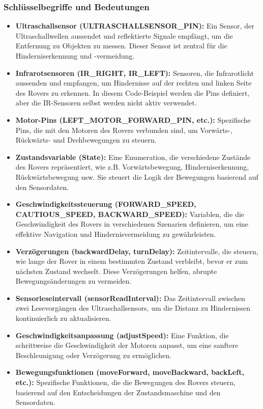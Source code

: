 \documentclass{vorlage-design-main}
\begin{document}
\newpage

\hypertarget{schluxfcsselbegriffe-und-bedeutungen}{%
\subsubsection{Schlüsselbegriffe und
Bedeutungen}\label{schluesselbegriffe-und-bedeutungen}}

\begin{itemize}
\item
  \textbf{Ultraschallsensor (ULTRASCHALLSENSOR\_PIN):} Ein Sensor, der
  Ultraschallwellen aussendet und reflektierte Signale empfängt, um die
  Entfernung zu Objekten zu messen. Dieser Sensor ist zentral für die
  Hinderniserkennung und -vermeidung.
\item
  \textbf{Infrarotsensoren (IR\_RIGHT, IR\_LEFT):} Sensoren, die
  Infrarotlicht aussenden und empfangen, um Hindernisse auf der rechten
  und linken Seite des Rovers zu erkennen. In diesem Code-Beispiel
  werden die Pins definiert, aber die IR-Sensoren selbst werden nicht
  aktiv verwendet.
\item
  \textbf{Motor-Pins (LEFT\_MOTOR\_FORWARD\_PIN, etc.):} Spezifische
  Pins, die mit den Motoren des Rovers verbunden sind, um Vorwärts-,
  Rückwärts- und Drehbewegungen zu steuern.
\item
  \textbf{Zustandsvariable (State):} Eine Enumeration, die verschiedene
  Zustände des Rovers repräsentiert, wie z.B. Vorwärtsbewegung,
  Hinderniserkennung, Rückwärtsbewegung usw. Sie steuert die Logik der
  Bewegungen basierend auf den Sensordaten.
\item
  \textbf{Geschwindigkeitssteuerung (FORWARD\_SPEED, CAUTIOUS\_SPEED,
  BACKWARD\_SPEED):} Variablen, die die Geschwindigkeit des Rovers in
  verschiedenen Szenarien definieren, um eine effektive Navigation und
  Hindernisvermeidung zu gewährleisten.
\item
  \textbf{Verzögerungen (backwardDelay, turnDelay):} Zeitintervalle, die
  steuern, wie lange der Rover in einem bestimmten Zustand verbleibt,
  bevor er zum nächsten Zustand wechselt. Diese Verzögerungen helfen,
  abrupte Bewegungsänderungen zu vermeiden.
\item
  \textbf{Sensorleseintervall (sensorReadInterval):} Das Zeitintervall
  zwischen zwei Lesevorgängen des Ultraschallsensors, um die Distanz zu
  Hindernissen kontinuierlich zu aktualisieren.
\item
  \textbf{Geschwindigkeitsanpassung (adjustSpeed):} Eine Funktion, die
  schrittweise die Geschwindigkeit der Motoren anpasst, um eine sanftere
  Beschleunigung oder Verzögerung zu ermöglichen.
\item
  \textbf{Bewegungsfunktionen (moveForward, moveBackward, backLeft,
  etc.):} Spezifische Funktionen, die die Bewegungen des Rovers steuern,
  basierend auf den Entscheidungen der Zustandsmaschine und den
  Sensordaten.
\end{itemize}
\end{document}
